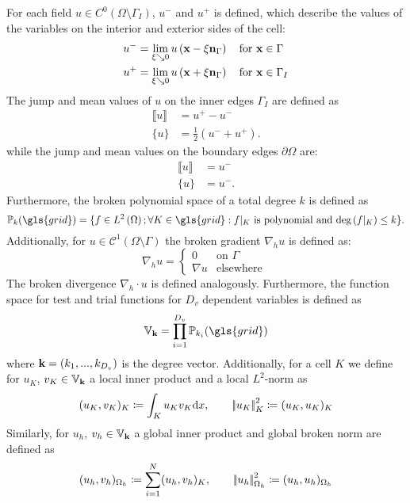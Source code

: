 For each field ${u} \in C^0\left(\Omega\setminus \Gamma_I\right)$, ${u}^-$  and ${u}^+$ is defined, which describe the values of the variables on the interior and exterior sides of the cell:
\begin{align}
	{u}^- & = \lim_{\xi \searrow 0} {u}\left(\textbf{x} - \xi \textbf{n}_{\Gamma}\right) \quad \text{for } \textbf{x}\in \Gamma   \\
	{u}^+ & = \lim_{\xi \searrow 0} {u}\left(\textbf{x} + \xi \textbf{n}_{\Gamma}\right) \quad \text{for } \textbf{x}\in \Gamma_I
\end{align}
The jump and mean values of ${u}$ on the inner edges $\Gamma_I$ are defined as
\begin{align}
	\llbracket {u} \rrbracket & = {u}^+-{u}^-                           \\
	\{{u}\}                   & = \frac{1}{2} \left({u}^-+{u}^+\right).
\end{align}
while the jump and mean values on the boundary edges $\partial \Omega$ are:
\begin{align}
	\llbracket {u} \rrbracket & = {u}^-  \\
	\{{u}\}                   & = {u}^-.
\end{align}
Furthermore, the broken polynomial space of a total degree $k$ is defined as
\begin{equation}
	\mathbb{P}_k(\gls{grid} )= \{f \in L^2\left(\Omega\right); \forall K \in \gls{grid} : f\vert_{K} \text{ is polynomial and deg}\left(f\vert_{K}\right)\leq k \}.
	\label{Eq:PolSpace}
\end{equation}
Additionally, for $u \in \mathcal{C}^1(\Omega \setminus \Gamma)$ the broken gradient $\nabla_h u$ is defined as:
\begin{equation}
	\nabla_h u
	= \begin{cases}
		0
		 & \text{on }\Gamma  \\
		\nabla u
		 & \text{elsewhere }
	\end{cases}
\end{equation}
The broken divergence $\nabla_h \cdot u$ is defined analogously. Furthermore, the function space for test and trial functions for $D_v$ dependent variables is defined as
\begin{equation}
	\mathbb{V}_\myvector{k} = \prod_{i=1}^{D_v} \mathbb{P}_{k_i}(\gls{grid})
	\label{Eq:Vspace}
\end{equation}
where $\textbf{k} = \left(k_1,...,k_{D_v}\right)$ is the degree vector. 
Additionally, for a cell $K$ we define for $u_K$, $v_K\in \mathbb{V}_{\textbf{k}}$ a local inner product and a local $L^2$-norm as
\begin{equation}
(u_K, v_K)_K \coloneqq \int_K u_K v_K\text{d}x, \qquad \left|\!\left| {u_K} \right|\!\right|^2_K \coloneqq(u_K,u_K)_K
\end{equation}
Similarly, for $u_h$, $v_h \in \mathbb{V}_{\textbf{k}}$ a global inner product and global broken norm are defined as
\begin{equation}
	(u_h, v_h)_{\Omega_h} \coloneqq \sum_{i = 1}^N (u_h, v_h)_K, \qquad \left|\!\left| {u_h} \right|\!\right|^2_{\Omega_h} \coloneqq(u_h,u_h)_{\Omega_h}
\end{equation}
